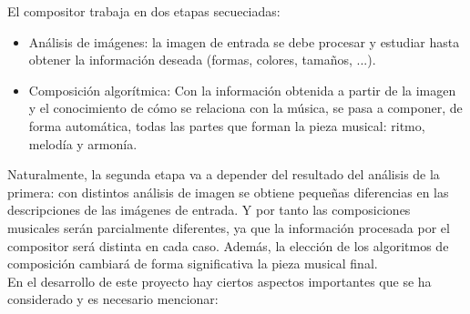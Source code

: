 		El compositor trabaja en dos etapas secueciadas:
		
		\begin{itemize}
		
		\item Análisis de imágenes: la imagen de entrada se debe procesar y estudiar hasta obtener la información deseada (formas, colores, tamaños, ...).

		\item Composición algorítmica: Con la información obtenida a partir de la imagen y el conocimiento de cómo se relaciona con la música, se pasa a componer, de forma automática, todas las partes que forman la pieza musical: ritmo, melodía y armonía.
		\end{itemize}
		
		Naturalmente, la segunda etapa va a depender del resultado del análisis de la primera: con distintos análisis de imagen se obtiene pequeñas diferencias en las descripciones de las imágenes de entrada. Y por tanto las composiciones musicales serán parcialmente diferentes, ya que la información procesada por el compositor será distinta en cada caso. Además, la elección de los algoritmos de composición cambiará de forma significativa la pieza musical final.\\
		
		En el desarrollo de este proyecto hay ciertos aspectos importantes que se ha considerado y es necesario mencionar:	

